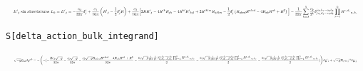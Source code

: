 \documentclass[11pt,a4paper]{article}
\begin{document}
\[
\resizebox{\textwidth}{!}{$\displaystyle E^i{}_j\ \text{sin abreviaturas }L_k = E^i{}_j=-\frac{c_{0}}{32\pi}\delta^i_j+\frac{c_{1}}{16\pi}\left(R^i{}_j-\frac12\delta^i_jR\right)+\frac{c_{2}}{16\pi}\Big[2RR^i{}_j-4R^{ik}R_{jk}-4R^{kl}R^i{}_{kjl}+2R^{iklm}R_{jklm}-\frac12\delta^i_j\left(R_{abcd}R^{abcd}-4R_{ab}R^{ab}+R^2\right)\Big]-\frac{1}{32\pi}\sum_{k=3}^{5}\frac{c_k}{2^k}\delta^{i a_1b_1\cdots a_kb_k}_{j c_1d_1\cdots c_kd_k}\prod_{r=1}^{k}R^{c_rd_r}{}_{a_rb_r}$}
\]


\noindent\texttt{S[delta\_action\_bulk\_integrand]}

\[
\resizebox{\textwidth}{!}{$\displaystyle \sqrt{-g}E_{ab}\delta g^{ab} = -\left(- (- \frac{R c_{1} \sqrt{-g}}{32 \pi} - \frac{c_{0} \sqrt{-g}}{32 \pi} - \frac{c_{2} \sqrt{-g} R_{abcd}R^{abcd}-4R_{ab}R^{ab}+R^2}{32 \pi} - \frac{c_{3} \sqrt{-g} \frac{1}{16\pi}\frac{1}{2^{3}}\,\delta^{a_1b_1\cdots a_3b_3}_{c_1d_1\cdots c_3d_3}\prod_{r=1}^{3}R^{c_rd_r}{}_{a_rb_r}}{2} - \frac{c_{4} \sqrt{-g} \frac{1}{16\pi}\frac{1}{2^{4}}\,\delta^{a_1b_1\cdots a_4b_4}_{c_1d_1\cdots c_4d_4}\prod_{r=1}^{4}R^{c_rd_r}{}_{a_rb_r}}{2} - \frac{c_{5} \sqrt{-g} \frac{1}{16\pi}\frac{1}{2^{5}}\,\delta^{a_1b_1\cdots a_5b_5}_{c_1d_1\cdots c_5d_5}\prod_{r=1}^{5}R^{c_rd_r}{}_{a_rb_r}}{2})\right)\delta \mathrm{g}{}^{i}{}_{i} + \sqrt{-g}\mathcal{R}_{(\leq 5)}{}^{ij}\delta \mathrm{g}{}_{ij}$}
\]
\end{document}
